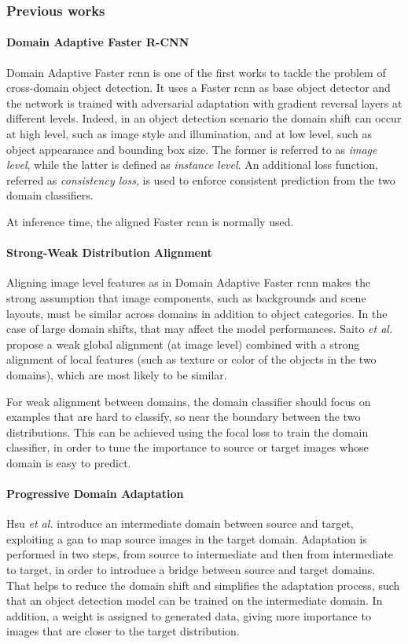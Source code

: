 \documentclass[%
    corpo=12pt,
    twoside,
    stile=classica,   
    tipotesi=magistrale,
    evenboxes,
    english,
	numerazioneromana,
]{toptesi}
\begin{document}
\subsubsection{Previous works}
\paragraph{Domain Adaptive Faster R-CNN}\label{sec:dafrcnn}
Domain Adaptive Faster \gls{rcnn}\cite{chen2018domain} is one of the first works to tackle the problem of cross-domain object detection. It uses a Faster \gls{rcnn} as base object detector and the network is trained with adversarial adaptation with gradient reversal layers at different levels. Indeed, in an object detection scenario the domain shift can occur at high level, such as image style and illumination, and at low level, such as object appearance and bounding box size. The former is referred to as \textit{image level}, while the latter is defined as \textit{instance level}. An additional loss function, referred as \textit{consistency loss}, is used to enforce consistent prediction from the two domain classifiers.

At inference time, the aligned Faster \gls{rcnn} is normally used.

\paragraph{Strong-Weak Distribution Alignment}
Aligning image level features as in Domain Adaptive Faster \gls{rcnn} makes the strong assumption that image components, such as backgrounds and scene layouts, must be similar across domains in addition to object categories. In the case of large domain shifts, that may affect the model performances. Saito \emph{et al.}\cite{saito2019strongweak} propose a weak global alignment (at image level) combined with a strong alignment of local features (such as texture or color of the objects in the two domains), which are most likely to be similar.

For weak alignment between domains, the domain classifier should focus on examples that are hard to classify, so near the boundary between the two distributions. This can be achieved using the focal loss to train the domain classifier, in order to tune the importance to source or target images whose domain is easy to predict.

\paragraph{Progressive Domain Adaptation}
Hsu \emph{et al.}\cite{hsu2019progressive} introduce an intermediate domain between source and target, exploiting a \gls{gan} to map source images in the target domain. Adaptation is performed in two steps, from source to intermediate and then from intermediate to target, in order to introduce a bridge between source and target domains. That helps to reduce the domain shift and simplifies the adaptation process, such that an object detection model can be trained on the intermediate domain. In addition, a weight is assigned to generated data, giving more importance to images that are closer to the target distribution.
\end{document}
